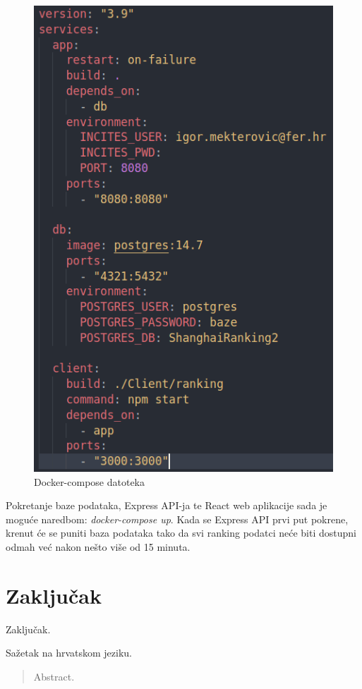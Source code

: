 \documentclass[times, utf8, zavrsni]{fer}
\begin{document}
\begin{figure}[htb]
        \centering
           \includegraphics[scale=0.33]{docker2.png} 
           \caption{Docker-compose datoteka}
           \label{fig:docker2}
           \end{figure}       
           \FloatBarrier
Pokretanje baze podataka, Express API-ja te React web aplikacije sada je moguće naredbom: \emph{docker-compose up}. Kada se Express API prvi put pokrene, krenut će se 
puniti baza podataka tako da svi ranking podatci neće biti dostupni odmah već nakon nešto više od 15 minuta.
\chapter{Zaključak}
Zaključak.




\begin{sazetak}
Sažetak na hrvatskom jeziku.

\end{sazetak}

\begin{abstract}
Abstract.

\end{abstract}
\end{document}
